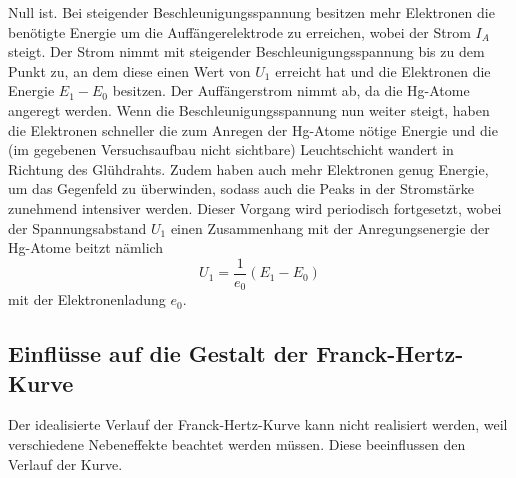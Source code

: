 Null ist. Bei steigender Beschleunigungsspannung besitzen mehr Elektronen die benötigte Energie um die Auffängerelektrode zu erreichen, wobei der Strom $I_A$
steigt. Der Strom nimmt mit steigender Beschleunigungsspannung bis zu dem Punkt zu, an dem diese einen Wert von $U_1$ erreicht hat und die 
Elektronen die Energie $E_1 - E_0$ besitzen. Der Auffängerstrom nimmt ab, da die Hg-Atome angeregt werden. 
Wenn die Beschleunigungsspannung nun weiter steigt, haben die Elektronen schneller
die zum Anregen der Hg-Atome nötige Energie und die (im gegebenen Versuchsaufbau nicht
sichtbare) Leuchtschicht wandert in Richtung des Glühdrahts. Zudem haben auch mehr
Elektronen genug Energie, um das Gegenfeld zu überwinden, sodass auch die Peaks in
der Stromstärke zunehmend intensiver werden.
Dieser Vorgang wird periodisch fortgesetzt, wobei der Spannungsabstand $U_1$ einen Zusammenhang  mit der Anregungsenergie der Hg-Atome beitzt nämlich
\begin{equation*}
    U_1 = \frac{1}{e_0} (E_1 - E_0)\label{eqn:Grundzustand}
\end{equation*}
mit der Elektronenladung $e_0$.

\subsection{Einflüsse auf die Gestalt der Franck-Hertz-Kurve}
\label{subsec:Franck-Hertz-Kurve}
Der idealisierte Verlauf der Franck-Hertz-Kurve kann nicht realisiert werden, weil verschiedene Nebeneffekte beachtet werden müssen.
Diese beeinflussen den Verlauf der Kurve.

